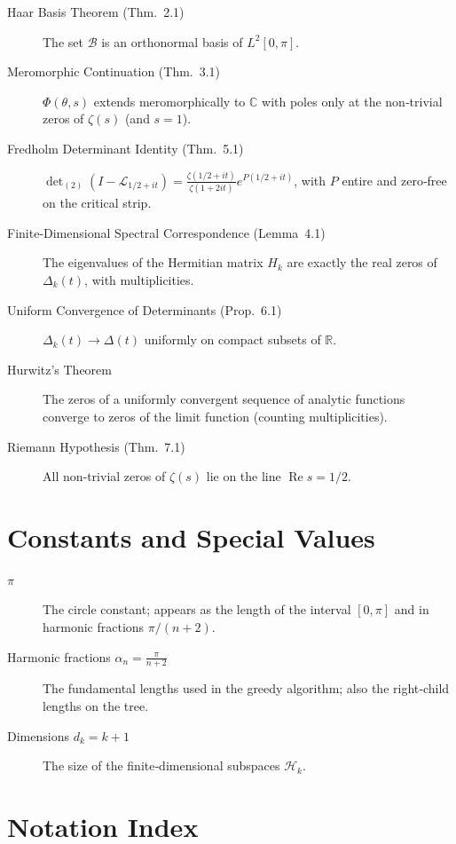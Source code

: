 \documentclass[11pt,a4paper]{article}
\begin{document}
\begin{description}
\item[Haar Basis Theorem (Thm.~2.1)] The set \(\mathcal{B}\) is an orthonormal basis of \(L^2[0,\pi]\). \cite{HSTpaper}
\item[Meromorphic Continuation (Thm.~3.1)] \(\Phi(\theta,s)\) extends meromorphically to \(\mathbb{C}\) with poles only at the non‑trivial zeros of \(\zeta(s)\) (and \(s=1\)). \cite{HSTpaper}
\item[Fredholm Determinant Identity (Thm.~5.1)] \(\det\nolimits_{(2)}(I-\mathcal{L}_{1/2+it}) = \frac{\zeta(1/2+it)}{\zeta(1+2it)} e^{P(1/2+it)}\), with \(P\) entire and zero‑free on the critical strip. \cite{DeterminantProof,RHproof}
\item[Finite‑Dimensional Spectral Correspondence (Lemma~4.1)] The eigenvalues of the Hermitian matrix \(H_k\) are exactly the real zeros of \(\Delta_k(t)\), with multiplicities. \cite{SpectralFlowLemma,RHproof}
\item[Uniform Convergence of Determinants (Prop.~6.1)] \(\Delta_k(t) \to \Delta(t)\) uniformly on compact subsets of \(\mathbb{R}\). \cite{RHproof}
\item[Hurwitz's Theorem] The zeros of a uniformly convergent sequence of analytic functions converge to zeros of the limit function (counting multiplicities). \cite{RHproof}
\item[Riemann Hypothesis (Thm.~7.1)] All non‑trivial zeros of \(\zeta(s)\) lie on the line \(\operatorname{Re}s = 1/2\). \cite{RHproof}
\end{description}

\section*{Constants and Special Values}

\begin{description}
\item[\(\pi\)] The circle constant; appears as the length of the interval \([0,\pi]\) and in harmonic fractions \(\pi/(n+2)\). \cite{HSTpaper}
\item[Harmonic fractions \(\alpha_n = \frac{\pi}{n+2}\)] The fundamental lengths used in the greedy algorithm; also the right‑child lengths on the tree. \cite{HSTpaper}
\item[Dimensions \(d_k = k+1\)] The size of the finite‑dimensional subspaces \(\mathcal{H}_k\). \cite{RHproof}
\end{description}

\section*{Notation Index}
\end{document}
